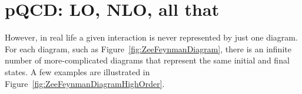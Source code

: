 
\section{pQCD: LO, NLO, all that}



However, in real life a given interaction is 
never represented by just one diagram.  
For each diagram, 
such as Figure~\ref{fig:ZeeFeynmanDiagram}, 
there is an infinite number of 
more-complicated diagrams that 
represent the same initial and final states.  
A few examples are illustrated in 
Figure~\ref{fig:ZeeFeynmanDiagramHighOrder}.  

